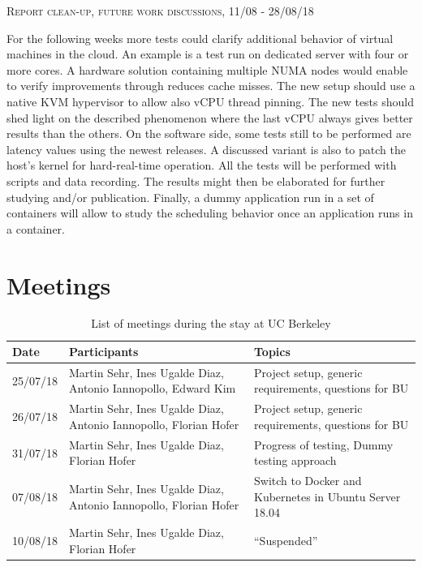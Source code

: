 \documentclass[]{scrartcl}
\begin{document}
{\small\textsc{Report clean-up, future work discussions, 11/08 - 28/08/18} \bigskip}

For the following weeks more tests could clarify additional behavior of virtual machines in the cloud. An example is a test run on dedicated server with four or more cores. A hardware solution containing multiple NUMA nodes would enable to verify improvements through reduces cache misses.
The new setup should use a native KVM hypervisor to allow also vCPU thread pinning. The new tests should shed light on the described phenomenon where the last vCPU always gives better results than the others.
On the software side, some tests still to be performed are latency values using the newest releases. A discussed variant is also to patch the host's kernel for hard-real-time operation.
All the tests will be performed with scripts and data recording. The results might then be elaborated for further studying and/or publication.
Finally, a dummy application run in a set of containers will allow to study the scheduling behavior once an application runs in a container.

\section{Meetings}
\label{sec:meeting}

\begin{table}[H]
	\centering
	\caption{List of meetings during the stay at UC Berkeley}
	
	\begin{tabular}{l p{5cm} p{5cm}}
	Date & Participants & Topics \\
	\hline
	25/07/18 & Martin Sehr, Ines Ugalde Diaz, Antonio Iannopollo, Edward Kim & Project setup, generic requirements, questions for BU\\
	26/07/18 & Martin Sehr, Ines Ugalde Diaz, Antonio Iannopollo, Florian Hofer & Project setup, generic requirements, questions for BU\\
	31/07/18 & Martin Sehr, Ines Ugalde Diaz, Florian Hofer & Progress of testing, Dummy testing approach\\
	07/08/18 & Martin Sehr, Ines Ugalde Diaz, Antonio Iannopollo, Florian Hofer & Switch to Docker and Kubernetes in Ubuntu Server 18.04\\
	10/08/18 & Martin Sehr, Ines Ugalde Diaz, Florian Hofer & ``Suspended''\\
	\hline
	\end{tabular}
	
	\label{tab:meeting}
\end{table}



\end{document}
